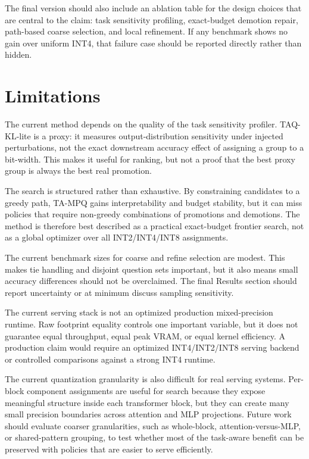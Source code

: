 \documentclass{article}
\newcommand{\method}{TA-MPQ}
\newcommand{\inttwo}{INT2}
\newcommand{\intfour}{INT4}
\newcommand{\inteight}{INT8}
\begin{document}
The final version should also include an ablation table for the design choices that are central to the claim: task sensitivity profiling, exact-budget demotion repair, path-based coarse selection, and local refinement. If any benchmark shows no gain over uniform \intfour{}, that failure case should be reported directly rather than hidden.

\section{Limitations}

The current method depends on the quality of the task sensitivity profiler. TAQ-KL-lite is a proxy: it measures output-distribution sensitivity under injected perturbations, not the exact downstream accuracy effect of assigning a group to a bit-width. This makes it useful for ranking, but not a proof that the best proxy group is always the best real promotion.

The search is structured rather than exhaustive. By constraining candidates to a greedy path, \method{} gains interpretability and budget stability, but it can miss policies that require non-greedy combinations of promotions and demotions. The method is therefore best described as a practical exact-budget frontier search, not as a global optimizer over all \inttwo{}/\intfour{}/\inteight{} assignments.

The current benchmark sizes for coarse and refine selection are modest. This makes tie handling and disjoint question sets important, but it also means small accuracy differences should not be overclaimed. The final Results section should report uncertainty or at minimum discuss sampling sensitivity.

The current serving stack is not an optimized production mixed-precision runtime. Raw footprint equality controls one important variable, but it does not guarantee equal throughput, equal peak VRAM, or equal kernel efficiency. A production claim would require an optimized \intfour{}/\inttwo{}/\inteight{} serving backend or controlled comparisons against a strong \intfour{} runtime.

The current quantization granularity is also difficult for real serving systems. Per-block component assignments are useful for search because they expose meaningful structure inside each transformer block, but they can create many small precision boundaries across attention and MLP projections. Future work should evaluate coarser granularities, such as whole-block, attention-versus-MLP, or shared-pattern grouping, to test whether most of the task-aware benefit can be preserved with policies that are easier to serve efficiently.
\end{document}
